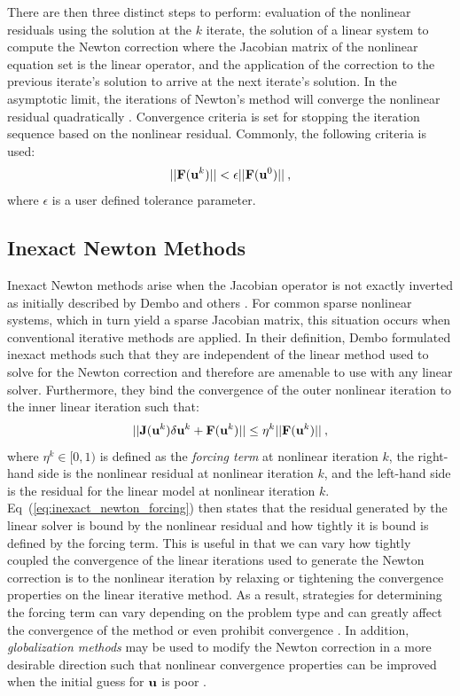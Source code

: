 There are then three distinct steps to perform: evaluation of the
nonlinear residuals using the solution at the $k$ iterate, the
solution of a linear system to compute the Newton correction where the
Jacobian matrix of the nonlinear equation set is the linear operator,
and the application of the correction to the previous iterate's
solution to arrive at the next iterate's solution. In the asymptotic
limit, the iterations of Newton's method will converge the nonlinear
residual quadratically \cite{kelley_iterative_1995}. Convergence
criteria is set for stopping the iteration sequence based on the
nonlinear residual. Commonly, the following criteria is used:
\begin{equation}
  ||\mathbf{F}(\mathbf{u}^{k})|| < \epsilon ||\mathbf{F}(\mathbf{u}^{0})||\:,
  \label{eq:newton_stopping_criteria}
\end{equation}
where $\epsilon$ is a user defined tolerance parameter. 

\subsection{Inexact Newton Methods}
\label{subsec:inexact_newton_methods}
Inexact Newton methods arise when the Jacobian operator is not exactly
inverted as initially described by Dembo and others
\cite{dembo_inexact_1982}. For common sparse nonlinear systems, which
in turn yield a sparse Jacobian matrix, this situation occurs when
conventional iterative methods are applied. In their definition, Dembo
formulated inexact methods such that they are independent of the
linear method used to solve for the Newton correction and therefore
are amenable to use with any linear solver. Furthermore, they bind the
convergence of the outer nonlinear iteration to the inner linear
iteration such that:
\begin{equation}
  ||\mathbf{J}(\mathbf{u}^k)\delta \mathbf{u}^k + \mathbf{F}(\mathbf{u}^k)|| \leq \eta^k
  ||\mathbf{F}(\mathbf{u}^k)||\:,
  \label{eq:inexact_newton_forcing}
\end{equation}
where $\eta^k \in [0,1)$ is defined as the \textit{forcing term} at
  nonlinear iteration $k$, the right-hand side is the nonlinear
  residual at nonlinear iteration $k$, and the left-hand side is the
  residual for the linear model at nonlinear iteration
  $k$. Eq~(\ref{eq:inexact_newton_forcing}) then states that the
  residual generated by the linear solver is bound by the nonlinear
  residual and how tightly it is bound is defined by the forcing
  term. This is useful in that we can vary how tightly coupled the
  convergence of the linear iterations used to generate the Newton
  correction is to the nonlinear iteration by relaxing or tightening
  the convergence properties on the linear iterative method. As a
  result, strategies for determining the forcing term can vary
  depending on the problem type and can greatly affect the convergence
  of the method or even prohibit convergence
  \cite{eisenstat_choosing_1996}. In addition, \textit{globalization
    methods} may be used to modify the Newton correction in a more
  desirable direction such that nonlinear convergence properties can
  be improved when the initial guess for $\mathbf{u}$ is poor
  \cite{pawlowski_globalization_2006}.

